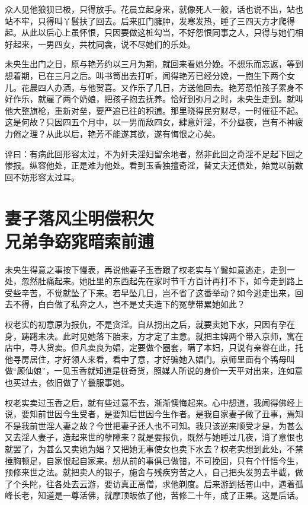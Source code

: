 \documentclass[a4paper,12pt,UTF8,twoside]{ctexbook}
\begin{document}
众人见他狼狈已极，只得放手。花晨立起身来，就像死人一般，话也说不出，站也站不牢，只得叫丫鬟扶了回去。后来肛门臃肿，发寒发热，睡了三四天方才爬得起。从此以后心上虽怀恨，只因要做这桩勾当，不好怨恨同事之人，只得与她们相好起来，一男四女，共枕同衾，说不尽她们的乐处。

未央生出门之日，原与艳芳约以三月为期，就回来看她分娩。不想乐而忘返，等到想着期，已在三月之后。叫书笥出去打听，闻得艳芳已经分娩，一胞生下两个女儿。花晨四人办酒，与他贺喜。又作乐了几日，方送他回去。艳芳恐怕孩子累身不好作乐，就雇了两个奶娘，把孩子抱去抚养。恰好到弥月之时，未央生走到。就叫他大整旗枪，重新对垒，要严追已往的积逋。那里晓得民穷财尽，一时催征不起。这是何故？只因四五个月中，以一男而敌四女，肆意奸淫，不分昼夜，岂有不神疲力倦之理？从此以后，艳芳不能遂其欲，遂有悔恨之心矣。

评曰：有病此回形容太过，不为奸夫淫妇留余地者，然非此回之奇淫不足起下回之惨报。纵容他处，正是难为他处。看到玉香独擅奇淫，替丈夫还债处，始觉以前数回不妨形容太过耳。

\chapter[妻子落风尘明偿积欠\ 兄弟争窈窕暗索前逋]{妻子落风尘明偿积欠\\兄弟争窈窕暗索前逋}

未央生得意之事按下慢表，再说他妻子玉香跟了权老实与丫鬟如意逃走，走到一处，忽然肚痛起来。她肚里的东西起先在家时节千方百计再打不下，如今走到路上受些辛苦，不觉就坠了下来。若早坠几日，岂不省了这番举动？如今逃走出来，回去不得，白白做了私奔之人，岂不是丈夫造下的冤孽带累她如此？

权老实的初意原为报仇，不是贪淫。自从拐出之后，就要卖她下水，只因有孕在身，踌躇未决。此时见她落下胎来，方才定了主意。就把主婢两个带入京师，寓在店中，寻人货卖。但凡卖良为娼，定要做个圈套，瞒了本妇，只说有亲眷在此，托他寻房居住，才好领人来看，看中了意，才好骗她入娼门。京师里面有个鸨母叫做“顾仙娘”，一见玉香就知道是桩奇货，照媒人所说的身价一天平对出来，连如意也买过去，依旧做了丫鬟服事她。

权老实卖过玉香之后，就有些过意不去，渐渐懊悔起来。心中想道，我闻得佛经上说，要知前世因今生受者，是要知后世因今生作者。是我自家妻子做了丑事，焉知不是我前世淫人妻之故？今世把妻子还人也不可知。我只该逆来顺受才是，为甚么又去淫人妻子，造起来世的孽障来？就是要报仇，既然与她睡过几夜，消了意恨也就罢了，为甚么又卖她为娼？又把她无事使女也卖下水去？权老实想到此处，不禁捶胸顿足，自家恨起自家来。想从前的事俱已做错，不可挽回，只有个忏悟今生，预修来世之法。就把卖人的银子，施舍与残疾穷苦之人，自己把头发剪去半截，做了个头陀，往各处去云游，要访真正高僧，求他剃度。后来游到括苍山中，遇着孤峰长老，知道是一尊活佛，就摩顶皈依了他，苦修二十年，成了正果。这是后话。
\end{document}

